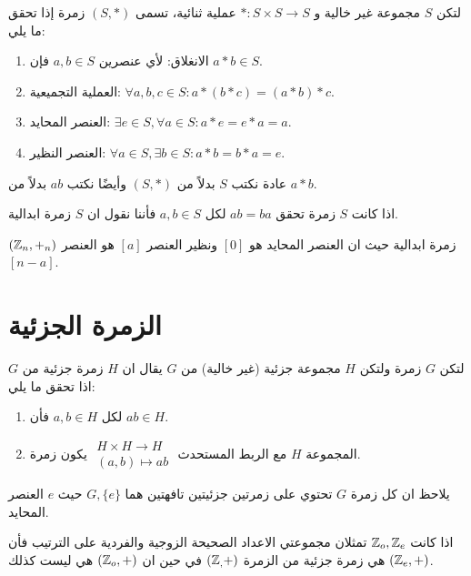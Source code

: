 \begin{definition}
	لتكن $S$ مجموعة غير خالية و $*:S\times S\to S$ عملية ثنائية، تسمى $(S, *)$ زمرة إذا تحقق ما يلي:
	\begin{enumerate}
		\item الانغلاق: لأي عنصرين $a, b\in S$ فإن $a*b\in S$.
		\item العملية التجميعية: $\forall a, b, c\in S: a*(b*c) = (a*b)*c$.
		\item العنصر المحايد: $\exists e\in S, \forall a\in S: a*e = e*a = a$.
		\item العنصر النظير: $\forall a\in S, \exists b\in S: a*b = b*a = e$.
	\end{enumerate}
	
	\begin{note}
		عادة نكتب $S$ بدلاً من $(S, *)$ وأيضًا نكتب $ab$ بدلاً من $a*b$.
	\end{note}
\end{definition}

\begin{definition}
	اذا كانت $S$ زمرة تحقق $ab=ba$ لكل $a,b\in S$ فأننا نقول ان $S$ زمرة ابدالية.
\end{definition}

\begin{example}
	$(\mathbb{Z}_n, +_n)$ زمرة ابدالية حيث ان العنصر المحايد هو $[0]$ ونظير العنصر $[a]$ هو العنصر $[n-a]$.
\end{example}

\section{الزمرة الجزئية}
\begin{definition}
	لتكن $G$ زمرة ولتكن $H$ مجموعة جزئية (غير خالية) من $G$ يقال ان $H$ زمرة جزئية من $G$ اذا تحقق ما يلي:
	\begin{enumerate}
		\item لكل $a,b\in H$ فأن $ab\in H$.
		\item المجموعة $H$ مع الربط المستحدث
		$
		\begin{array}{c}
			H\times H \to H\\
			(a, b) \mapsto ab
		\end{array}
		$
		يكون زمرة.
	\end{enumerate}
	
	\noindent 
	يلاحظ ان كل زمرة $G$ تحتوي على زمرتين جزئيتين تافهتين هما $G, \{e\}$ حيث $e$ العنصر المحايد. 
\end{definition}

\begin{example}
	اذا كانت $\mathbb{Z}_o, \mathbb{Z}_e$ تمثلان مجموعتي الاعداد الصحيحة الزوجية والفردية على الترتيب فأن $(\mathbb{Z}_e, +)$ هي زمرة جزئية من الزمرة $(\mathbb{Z}_,+)$ في حين ان $(\mathbb{Z}_o, +)$ هي ليست كذلك.
\end{example}

